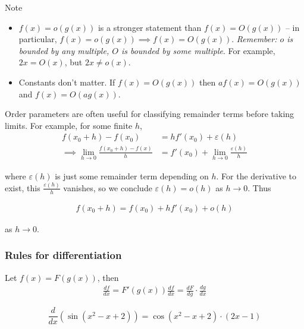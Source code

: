 \documentclass{../../template/note}
\begin{document}
    \begin{remark*} Note
        \begin{itemize}
            \item \(f(x) = o(g(x))\) is a stronger statement than \(f(x) = O(g(x))\) -- in particular, \(f(x) = o(g(x)) \implies f(x) = O(g(x))\). \emph{Remember: \(o\) is bounded by any multiple, \(O\) is bounded by some multiple}. For example, \(2x = O(x)\), but \(2x \neq o(x)\).
            \item Constants don't matter. If \(f(x) = O(g(x))\) then \(af(x) = O(g(x))\) and \(f(x) = O(ag(x))\).
        \end{itemize}
    \end{remark*}
    
    \noindent Order parameters are often useful for classifying remainder terms before taking limits. For example, for some finite \(h\),
    \begin{align*}
        f(x_0+h) - f(x_0) &= hf'(x_0) + \varepsilon(h) \\
        \implies \lim_{h \to 0}\frac{f(x_0+h)-f(x)}{h} &= f'(x_0) + \lim_{h \to 0} \frac{\varepsilon(h)}{h}
    \end{align*}

    where \(\varepsilon(h)\) is just some remainder term depending on \(h\). For the derivative to exist, this \(\frac{\varepsilon(h)}{h}\) vanishes, so we conclude \(\varepsilon(h) = o(h)\) as \(h \to 0\). Thus

    \begin{align*}
        f(x_0 + h) = f(x_0) + hf'(x_0) + o(h)
    \end{align*}
    
    as \(h \to 0\).


    \subsubsection{Rules for differentiation}

    \begin{theorem}
        Let \(f(x) = F(g(x))\), then
        \begin{align*}
            \frac{df}{dx} = F'(g(x))\frac{df}{dx} = \frac{dF}{dg}\cdot\frac{dg}{dx}
        \end{align*}
        
        
    \end{theorem}

    \begin{example}
        \[
            \frac{d}{dx}\left(\sin(x^2-x+2)\right) = \cos(x^2-x+2) \cdot (2x-1)
        \]
        
        
    \end{example}
    
\end{document}
